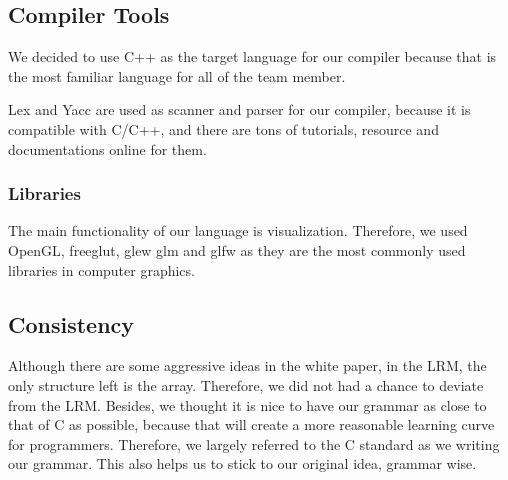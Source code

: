 \subsection{Compiler Tools}

We decided to use C++ as the target language for our compiler because that is the most familiar
language for all of the team member. 

Lex and Yacc are used as scanner and parser for our compiler, because it is compatible with C/C++,
and there are tons of tutorials, resource and documentations online for them. 

\subsubsection{Libraries}

The main functionality of our language is visualization. Therefore, we used OpenGL, freeglut, glew
glm and glfw as they are the most commonly used libraries in computer graphics. 

\subsection{Consistency}

Although there are some aggressive ideas in the white paper, in the LRM, the only structure left is
the array. Therefore, we did not had a chance to deviate from the LRM. Besides, we thought it is
nice to have our grammar as close to that of C as possible, because that will create a more
reasonable learning curve for programmers. Therefore, we largely referred to the C standard as we
writing our grammar. This also helps us to stick to our original idea, grammar wise. 
